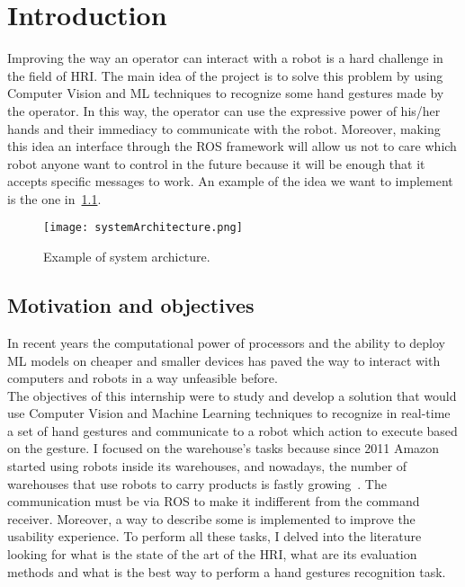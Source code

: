 \documentclass[../thesis.tex]{subfiles}
\begin{document}
\chapter{Introduction}\label{cap:introduction}
Improving the way an operator can interact with a robot is a hard challenge in the field of \acrfull{HRI}. The main idea of the project is to solve this problem by using Computer Vision and \acrfull{ML} techniques to recognize some hand gestures made by the operator. In this way, the operator can use the expressive power of his/her hands and their immediacy to communicate with the robot. Moreover, making this idea an interface through the \acrfull{ROS} framework will allow us not to care which robot anyone want to control in the future because it will be enough that it accepts specific messages to work. An example of the idea we want to implement is the one in~\ref{fig:systemArchitecture}.

\begin{figure}[H]
  \centering
  \texttt{[image: systemArchitecture.png]}
  \caption{Example of system archicture.}
  \label{fig:systemArchitecture}
\end{figure}

\section{Motivation and objectives}\label{s:motivation-and-objectives}
In recent years the computational power of processors and the ability to deploy \acrshort{ML} models on cheaper and smaller devices has paved the way to interact with computers and robots in a way unfeasible before.\\

The objectives of this internship were to study and develop a solution that would use Computer Vision and Machine Learning techniques to recognize in real-time a set of hand gestures and communicate to a robot which action to execute based on the gesture. I focused on the warehouse's tasks because since 2011 Amazon started using robots inside its warehouses, and nowadays, the number of warehouses that use robots to carry products is fastly growing~\cite{article:bogue2016}. The communication must be via \acrshort{ROS} to make it indifferent from the command receiver. Moreover, a way to describe some  is implemented to improve the usability experience. To perform all these tasks, I delved into the literature looking for what is the state of the art of the \acrshort{HRI}, what are its evaluation methods and what is the best way to perform a hand gestures recognition task.
\end{document}
